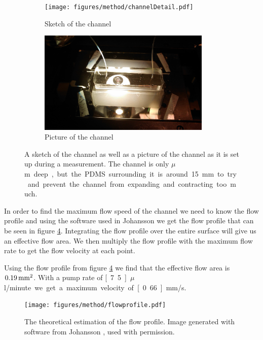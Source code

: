 \begin{figure}[H]
\centering
\begin{subfigure}[b]{0.45\textwidth}
\texttt{[image: figures/method/channelDetail.pdf]}
\caption{Sketch of the channel}\label{fig:channelsketch}
\end{subfigure}
\begin{subfigure}[b]{0.45\textwidth}
\includegraphics[width=0.9\textwidth]{figures/method/ChannelZoomed.jpg}
\caption{Picture of the channel}\label{fig:channelpicture}
\end{subfigure}
\caption{A sketch of the channel as well as a picture of the channel as it is set up during a measurement. The channel is only \unit[150]{$\mu$m} deep, but the PDMS surrounding it is around 15 mm to try and prevent the channel from expanding and contracting too much.}
\label{fig:channel}
\end{figure}

In order to find the maximum flow speed of the channel we need to know the flow profile and using the software used in Johansson \cite{AntonThesis} we get the flow profile that can be seen in figure \ref{fig:flowprofile}. Integrating 
the flow profile over the entire surface will give us an effective flow area. We then multiply the flow profile with 
the maximum flow rate to get the flow velocity at each point. 

Using the flow profile from figure \ref{fig:flowprofile} we find that the effective flow area is $\unit[0.19]{mm^2}$. With a pump rate of \unit[7.5]{$\mu$l/minute} we get a maximum velocity of \unit[0.66]{mm/s}.



\begin{figure}[H]
\begin{center}
\texttt{[image: figures/method/flowprofile.pdf]}
\end{center}
\caption{The theoretical estimation of the flow profile. Image generated with software from Johansson \cite{AntonThesis}, used with permission.}
\label{fig:flowprofile}
\end{figure}


